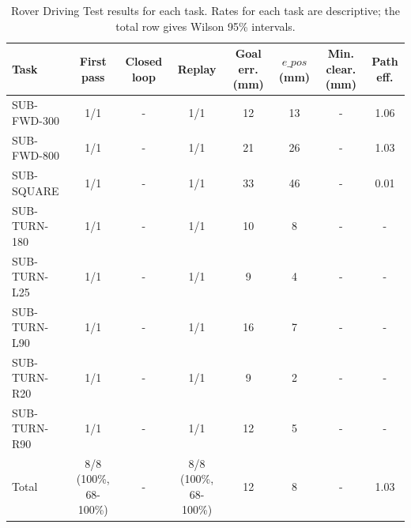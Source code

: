 \begin{table}[htbp]
\centering
\caption{Rover Driving Test results for each task. Rates for each task are descriptive; the total row gives Wilson 95\% intervals.}
\label{tab:rdt_per_task}
\small
\begin{tabular}{lccccccc}
\toprule
Task & First pass & Closed loop & Replay & Goal err. (mm) & $e\_{pos}$ (mm) & Min. clear. (mm) & Path eff. \\
\midrule
SUB-FWD-300 & 1/1 & - & 1/1 & 12 & 13 & - & 1.06 \\
SUB-FWD-800 & 1/1 & - & 1/1 & 21 & 26 & - & 1.03 \\
SUB-SQUARE & 1/1 & - & 1/1 & 33 & 46 & - & 0.01 \\
SUB-TURN-180 & 1/1 & - & 1/1 & 10 & 8 & - & - \\
SUB-TURN-L25 & 1/1 & - & 1/1 & 9 & 4 & - & - \\
SUB-TURN-L90 & 1/1 & - & 1/1 & 16 & 7 & - & - \\
SUB-TURN-R20 & 1/1 & - & 1/1 & 9 & 2 & - & - \\
SUB-TURN-R90 & 1/1 & - & 1/1 & 12 & 5 & - & - \\
Total & 8/8 (100\%, 68-100\%) & - & 8/8 (100\%, 68-100\%) & 12 & 8 & - & 1.03 \\
\bottomrule
\end{tabular}
\end{table}
